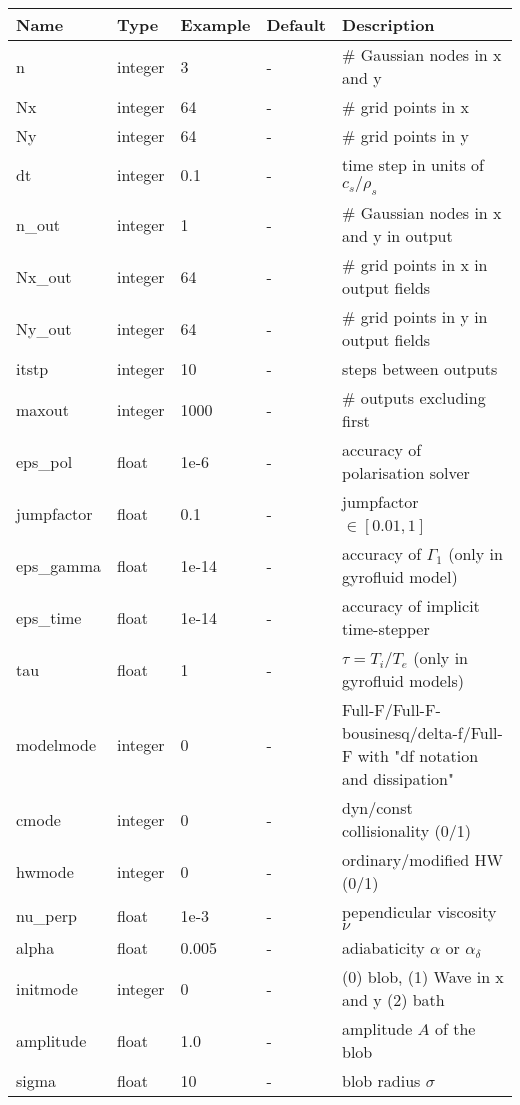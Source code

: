 \documentclass{hitec} %
\begin{document}
\begin{longtable}{llll>{\RaggedRight}p{7cm}}
\toprule
\rowcolor{gray!50}\textbf{Name} &  \textbf{Type} & \textbf{Example} & \textbf{Default} & \textbf{Description}  \\ \midrule
n      & integer & 3 & - &\# Gaussian nodes in x and y \\
Nx     & integer &64& - &\# grid points in x \\
Ny     & integer &64& - &\# grid points in y \\
dt     & integer &0.1& - &time step in units of $c_s/\rho_s$ \\
n\_out  & integer &1  & - &\# Gaussian nodes in x and y in output \\
Nx\_out & integer &64& - &\# grid points in x in output fields \\
Ny\_out & integer &64& - &\# grid points in y in output fields \\
itstp  & integer &10  & - &   steps between outputs \\
maxout & integer &1000& - &      \# outputs excluding first \\
eps\_pol   & float &1e-6   & - &  accuracy of polarisation solver \\
jumpfactor & float &0.1    & - &  jumpfactor $\in \left[0.01,1\right]$\ \\
eps\_gamma & float &1e-14  & - & accuracy of $\Gamma_1$ (only in gyrofluid model) \\
eps\_time  & float &1e-14  & - & accuracy of implicit time-stepper \\
tau        & float &1      & - & $\tau = T_i/T_e$ (only in gyrofluid models) \\
modelmode  & integer &0   & - & Full-F/Full-F-bousinesq/delta-f/Full-F with "df notation and dissipation" \\
cmode      & integer &0   & - & dyn/const collisionality (0/1) \\
hwmode     & integer &0   & - & ordinary/modified HW (0/1) \\
nu\_perp   & float &1e-3  & - & pependicular viscosity $\nu$ \\
alpha      & float &0.005  & - & adiabaticity $\alpha$ or $\alpha_\delta$ \\
initmode   & integer &0    & - & (0) blob, (1) Wave in x and y (2) bath\\
amplitude  & float &1.0    & - & amplitude $A$ of the blob \\
sigma      & float &10     & - & blob radius $\sigma$ \\

\end{longtable}
\end{document}
